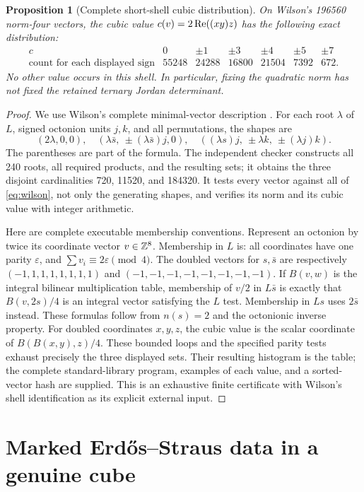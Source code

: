 \documentclass[11pt,reqno]{amsart}
\newtheorem{proposition}[theorem]{Proposition}
\theoremstyle{definition}\newtheorem{definition}[theorem]{Definition}
\theoremstyle{remark}\newtheorem{remark}[theorem]{Remark}
\newcommand{\eps}{\varepsilon}
\begin{document}
\begin{proposition}[Complete short-shell cubic distribution]\label{prop:leechhist}
On Wilson's 196560 norm-four vectors, the cubic value
$c(v)=2\operatorname{Re}((xy)z)$ has the following exact distribution:
\[
\begin{array}{c|rrrrrr}
 c&0&\pm1&\pm3&\pm4&\pm5&\pm7\\\hline
 \text{count for each displayed sign}&55248&24288&16800&21504&7392&672.
\end{array}
\]
No other value occurs in this shell. In particular, fixing the quadratic norm
has not fixed the retained ternary Jordan determinant.
\end{proposition}
\begin{proof}
We use Wilson's complete minimal-vector description \cite[\S3, p.~4]{Wilson}.
For each root $\lambda$ of $L$, signed octonion units $j,k$, and all permutations,
the shapes are
\[
 (2\lambda,0,0),\quad
 (\lambda\bar s,\ \pm(\lambda\bar s)j,0),\quad
 ((\lambda s)j,\ \pm\lambda k,\ \pm(\lambda j)k).
\]
The parentheses are part of the formula. The independent checker constructs
all 240 roots, all required products, and the resulting sets; it obtains the
three disjoint cardinalities 720, 11520, and 184320. It tests every vector
against all of \eqref{eq:wilson}, not only the generating shapes, and verifies
its norm and its cubic value with integer arithmetic.

Here are complete executable membership conventions. Represent an octonion by
twice its coordinate vector $v\in\mathbb Z^8$. Membership in $L$ is: all coordinates
have one parity $\eps$, and $\sum v_i\equiv2\eps\pmod4$.
The doubled vectors for $s,\bar s$ are respectively
$(-1,1,1,1,1,1,1,1)$ and $(-1,-1,-1,-1,-1,-1,-1,-1)$.
If $B(v,w)$ is the integral bilinear multiplication table, membership of $v/2$
in $L\bar s$ is exactly that $B(v,2s)/4$ is an integral vector satisfying the
$L$ test. Membership in $Ls$ uses $2\bar s$ instead. These formulas follow
from $n(s)=2$ and the octonionic inverse property. For doubled coordinates
$x,y,z$, the cubic value is the scalar coordinate of $B(B(x,y),z)/4$.
These bounded loops and the specified parity tests exhaust precisely the
three displayed sets. Their resulting histogram is the table; the complete
standard-library program, examples of each value, and a sorted-vector hash
are supplied. This is an exhaustive finite certificate with Wilson's shell
identification as its explicit external input.
\end{proof}

\section{Marked Erd\H{o}s--Straus data in a genuine cube}
\end{document}
